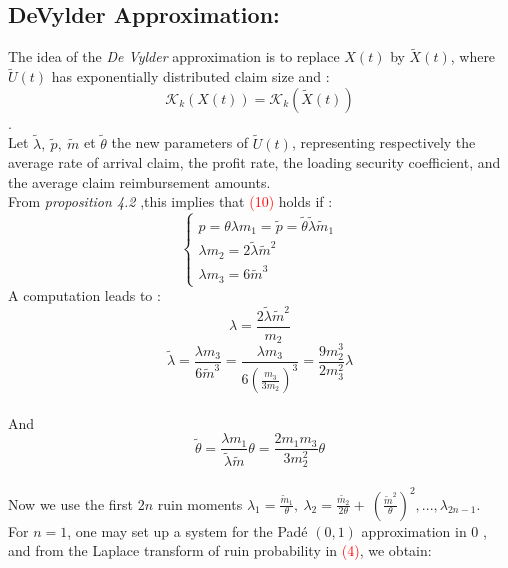 \subsection{DeVylder Approximation:}
The idea of the \textit{De Vylder} approximation is to replace $X(t)$ by $\tilde{X}(t)$, where $ \tilde{U}(t)$ has exponentially distributed claim size and : \\
\begin{equation}
 \mathcal{K}_{k}(X(t)) = \mathcal{K}_{k}(\tilde{X}(t))
\end{equation}. \\
Let $\tilde{\lambda}, \ \tilde{p}, \ \tilde{m}$ et $\tilde{\theta}$ the new parameters of $\tilde{U}(t)$, representing respectively the average rate of arrival claim, the profit rate, the loading security coefficient, and the average claim reimbursement amounts. \\
From \textit{proposition 4.2} ,this implies that \textcolor{red}{(10)} holds if :
\begin{equation}
\left\lbrace
\begin{aligned}
p= \theta \lambda m_{1} = \tilde{p} =\tilde{\theta}\tilde{\lambda} \tilde{m}_{1} \\
\lambda m_{2} = 2\tilde{\lambda}\tilde{m}^{2} \\
\lambda m_{3} = 6\tilde{m}^{3}
\end{aligned}
\right.
\end{equation}
\newpage
A computation leads to : \\
$$\lambda = \frac{2 \tilde{\lambda}\tilde{m}^{2}}{m_{2}}$$
 $$\tilde{\lambda} =\frac{\lambda m_{3}}{6 \tilde{m}^{3}} =\frac{\lambda m_{3}}{6 (\frac{m_{3}}{3 m_{2}})^{3}} = \frac{9 m_{2}^{3}}{2 m_{3}^{2}}\lambda $$ \\
 And
$$\tilde{\theta}= \frac{\lambda m_{1}}{\tilde{\lambda}\tilde{m}}\theta =\frac{2 m_{1}m_{3}}{3m_{2}^{2}}\theta$$ \\
Now we use the first $2n$ ruin moments $ \lambda_{1}=\frac{\tilde{m}_{1}}{\theta}, \ \lambda_{2}= \frac{\tilde{m_{2}}}{2 \theta} + \ (\frac{\tilde{m}^{2}}{\theta})^{2}, ..., \lambda_{2n-1}.$ \\
For $n=1$, one may set up a system for the Padé $(0,1)$ approximation in $0$ , and from the Laplace transform of ruin probability in \textcolor{red}{(4)}, we obtain:
\\
